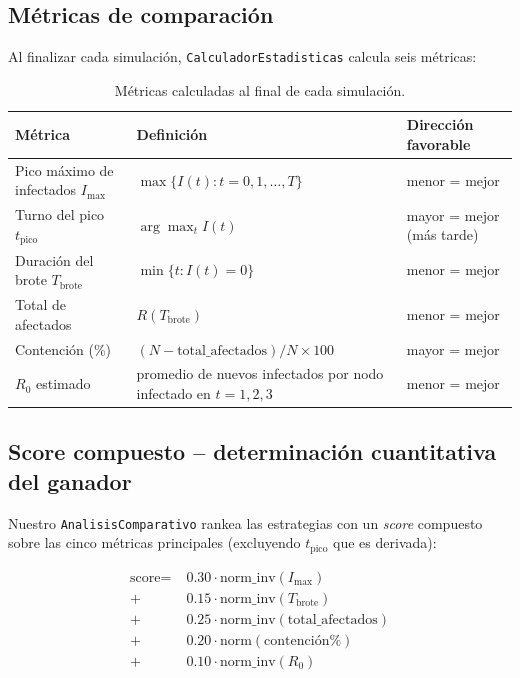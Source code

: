 \documentclass[spanish,notitlepage,letterpaper, 12pt]{article}
\begin{document}
\subsection{M\'etricas de comparaci\'on}

Al finalizar cada simulaci\'on, \texttt{CalculadorEstadisticas} calcula seis m\'etricas:

\begin{table}[H]
\centering
\small
\caption{M\'etricas calculadas al final de cada simulaci\'on.}
\label{tab:metricas}
\begin{tabular}{l p{6.5cm} p{3.5cm}}
\toprule
\textbf{M\'etrica} & \textbf{Definici\'on} & \textbf{Direcci\'on favorable} \\
\midrule
Pico m\'aximo de infectados $I_{\max}$ & $\max\{I(t) : t = 0, 1, \ldots, T\}$ & menor = mejor \\
Turno del pico $t_{\text{pico}}$ & $\arg\max_t I(t)$ & mayor = mejor (m\'as tarde) \\
Duraci\'on del brote $T_{\text{brote}}$ & $\min\{t : I(t) = 0\}$ & menor = mejor \\
Total de afectados & $R(T_{\text{brote}})$ & menor = mejor \\
Contenci\'on (\%) & $(N - \text{total\_afectados}) / N \times 100$ & mayor = mejor \\
$R_0$ estimado & promedio de nuevos infectados por nodo infectado en $t = 1, 2, 3$ & menor = mejor \\
\bottomrule
\end{tabular}
\end{table}

\subsection{Score compuesto -- determinaci\'on cuantitativa del ganador}

Nuestro \texttt{AnalisisComparativo} rankea las estrategias con un \textit{score} compuesto sobre las cinco m\'etricas principales (excluyendo $t_{\text{pico}}$ que es derivada):

\begin{equation}
\boxed{
\begin{aligned}
\text{score} = \; & 0.30 \cdot \text{norm\_inv}(I_{\max}) \\
            + \; & 0.15 \cdot \text{norm\_inv}(T_{\text{brote}}) \\
            + \; & 0.25 \cdot \text{norm\_inv}(\text{total\_afectados}) \\
            + \; & 0.20 \cdot \text{norm}(\text{contenci\'on\%}) \\
            + \; & 0.10 \cdot \text{norm\_inv}(R_0)
\end{aligned}
}
\label{eq:score_compuesto}
\end{equation}
\end{document}
